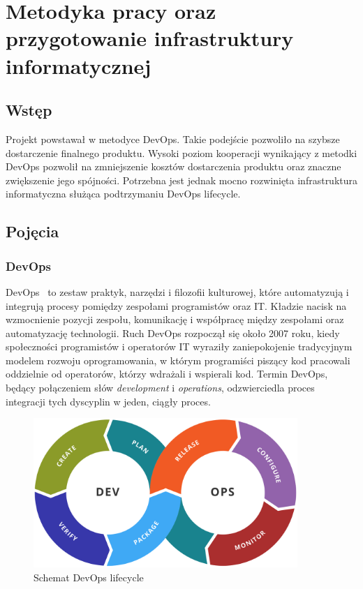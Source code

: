
\chapter{Metodyka pracy oraz przygotowanie infrastruktury informatycznej}

\section{Wstęp}
Projekt powstawał w metodyce DevOps. Takie podejście pozwoliło na szybsze dostarczenie finalnego produktu. Wysoki poziom kooperacji wynikający z metodki DevOps pozwolił na zmniejszenie kosztów dostarczenia produktu oraz znaczne zwiększenie jego spójności. Potrzebna jest jednak mocno rozwinięta infrastruktura informatyczna służąca podtrzymaniu DevOps lifecycle.

\section{Pojęcia}
	\subsection{DevOps}
	DevOps~\cite{devops} to zestaw praktyk, narzędzi i filozofii kulturowej, które automatyzują i integrują procesy pomiędzy zespołami programistów oraz IT. Kładzie nacisk na wzmocnienie pozycji zespołu, komunikację i współpracę między zespołami oraz automatyzację technologii.
	Ruch DevOps rozpoczął się około 2007 roku, kiedy społeczności programistów i operatorów IT wyraziły zaniepokojenie tradycyjnym modelem rozwoju oprogramowania, w którym programiści piszący kod pracowali oddzielnie od operatorów, którzy wdrażali i wspierali kod. Termin DevOps, będący połączeniem słów \textit{development} i \textit{operations}, odzwierciedla proces integracji tych dyscyplin w jeden, ciągły proces.
\begin{figure}[H]
\centering\includegraphics[width=10cm]{figures/devops_lifecycle}
\caption{Schemat DevOps lifecycle~\cite{devops_lifecycle}}\label{rys:DevOps lifecycle}
\end{figure}

